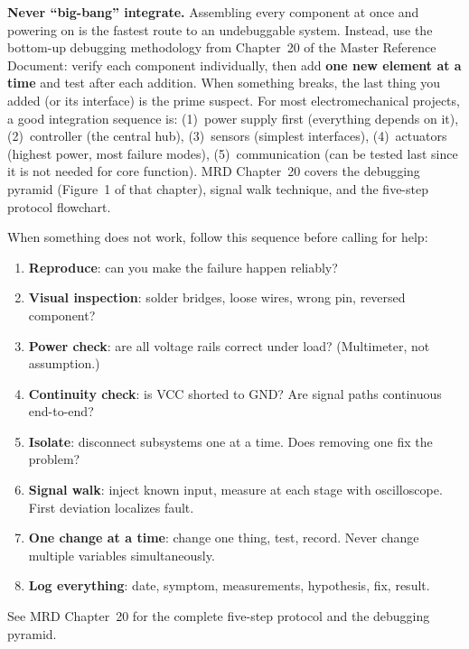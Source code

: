 \documentclass[11pt,letterpaper]{article}
\begin{document}
\begin{warnbox}
\textbf{Never ``big-bang'' integrate.} Assembling every component at once and powering on is the fastest route to an undebuggable system. Instead, use the bottom-up debugging methodology from Chapter~20 of the Master Reference Document: verify each component individually, then add \textbf{one new element at a time} and test after each addition. When something breaks, the last thing you added (or its interface) is the prime suspect. For most electromechanical projects, a good integration sequence is: (1)~power supply first (everything depends on it), (2)~controller (the central hub), (3)~sensors (simplest interfaces), (4)~actuators (highest power, most failure modes), (5)~communication (can be tested last since it is not needed for core function). MRD Chapter~20 covers the debugging pyramid (Figure~1 of that chapter), signal walk technique, and the five-step protocol flowchart.
\end{warnbox}

\begin{checklistbox}
When something does not work, follow this sequence before calling for help:
\begin{enumerate}[leftmargin=*, itemsep=1pt, topsep=0pt]
    \item \textbf{Reproduce}: can you make the failure happen reliably?
    \item \textbf{Visual inspection}: solder bridges, loose wires, wrong pin, reversed component?
    \item \textbf{Power check}: are all voltage rails correct under load? (Multimeter, not assumption.)
    \item \textbf{Continuity check}: is VCC shorted to GND? Are signal paths continuous end-to-end?
    \item \textbf{Isolate}: disconnect subsystems one at a time. Does removing one fix the problem?
    \item \textbf{Signal walk}: inject known input, measure at each stage with oscilloscope. First deviation localizes fault.
    \item \textbf{One change at a time}: change one thing, test, record. Never change multiple variables simultaneously.
    \item \textbf{Log everything}: date, symptom, measurements, hypothesis, fix, result.
\end{enumerate}
See MRD Chapter~20 for the complete five-step protocol and the debugging pyramid.
\end{checklistbox}
\end{document}

